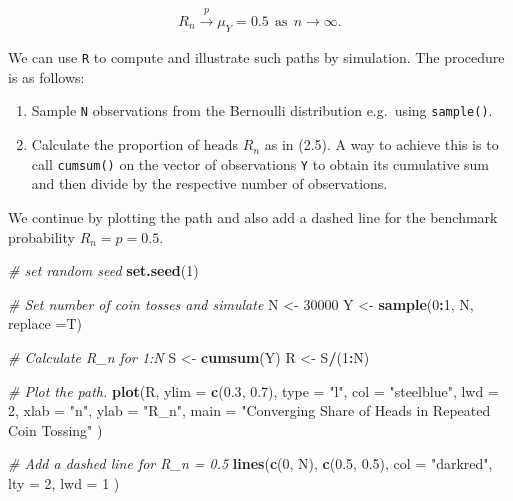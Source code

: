 \documentclass[]{book}
\newenvironment{Shaded}{\begin{snugshade}}{\end{snugshade}}
\newcommand{\KeywordTok}[1]{\textcolor[rgb]{0.13,0.29,0.53}{\textbf{#1}}}
\newcommand{\DataTypeTok}[1]{\textcolor[rgb]{0.13,0.29,0.53}{#1}}
\newcommand{\DecValTok}[1]{\textcolor[rgb]{0.00,0.00,0.81}{#1}}
\newcommand{\FloatTok}[1]{\textcolor[rgb]{0.00,0.00,0.81}{#1}}
\newcommand{\StringTok}[1]{\textcolor[rgb]{0.31,0.60,0.02}{#1}}
\newcommand{\CommentTok}[1]{\textcolor[rgb]{0.56,0.35,0.01}{\textit{#1}}}
\newcommand{\OperatorTok}[1]{\textcolor[rgb]{0.81,0.36,0.00}{\textbf{#1}}}
\newcommand{\NormalTok}[1]{#1}
\providecommand{\tightlist}{%
  \setlength{\itemsep}{0pt}\setlength{\parskip}{0pt}}
\theoremstyle{definition}
\theoremstyle{definition}
\theoremstyle{definition}
\theoremstyle{remark}
\begin{document}
\[ R_n \xrightarrow[]{p} \mu_Y=0.5 \ \ \text{as} \ \ n \rightarrow \infty.  \]

We can use \texttt{R} to compute and illustrate such paths by
simulation. The procedure is as follows:

\begin{enumerate}
\def\labelenumi{\arabic{enumi}.}
\tightlist
\item
  Sample \texttt{N} observations from the Bernoulli distribution
  e.g.~using \texttt{sample()}.
\item
  Calculate the proportion of heads \(R_n\) as in (2.5). A way to
  achieve this is to call \texttt{cumsum()} on the vector of
  observations \texttt{Y} to obtain its cumulative sum and then divide
  by the respective number of observations.
\end{enumerate}

We continue by plotting the path and also add a dashed line for the
benchmark probability \(R_n = p = 0.5\).

\begin{Shaded}
\begin{Highlighting}[]
\CommentTok{# set random seed}
\KeywordTok{set.seed}\NormalTok{(}\DecValTok{1}\NormalTok{)}

\CommentTok{# Set number of coin tosses and simulate}
\NormalTok{N <-}\StringTok{ }\DecValTok{30000}
\NormalTok{Y <-}\StringTok{ }\KeywordTok{sample}\NormalTok{(}\DecValTok{0}\OperatorTok{:}\DecValTok{1}\NormalTok{, N, }\DataTypeTok{replace =}\NormalTok{T)}

\CommentTok{# Calculate R_n for 1:N}
\NormalTok{S <-}\StringTok{ }\KeywordTok{cumsum}\NormalTok{(Y)}
\NormalTok{R <-}\StringTok{ }\NormalTok{S}\OperatorTok{/}\NormalTok{(}\DecValTok{1}\OperatorTok{:}\NormalTok{N)}

\CommentTok{# Plot the path.}
\KeywordTok{plot}\NormalTok{(R, }
     \DataTypeTok{ylim =} \KeywordTok{c}\NormalTok{(}\FloatTok{0.3}\NormalTok{, }\FloatTok{0.7}\NormalTok{), }
     \DataTypeTok{type =} \StringTok{"l"}\NormalTok{, }
     \DataTypeTok{col =} \StringTok{"steelblue"}\NormalTok{, }
     \DataTypeTok{lwd =} \DecValTok{2}\NormalTok{, }
     \DataTypeTok{xlab =} \StringTok{"n"}\NormalTok{, }
     \DataTypeTok{ylab =} \StringTok{"R_n"}\NormalTok{,}
     \DataTypeTok{main =} \StringTok{"Converging Share of Heads in Repeated Coin Tossing"}
\NormalTok{     )}

\CommentTok{# Add a dashed line for R_n = 0.5}
\KeywordTok{lines}\NormalTok{(}\KeywordTok{c}\NormalTok{(}\DecValTok{0}\NormalTok{, N), }
      \KeywordTok{c}\NormalTok{(}\FloatTok{0.5}\NormalTok{, }\FloatTok{0.5}\NormalTok{), }
      \DataTypeTok{col =} \StringTok{"darkred"}\NormalTok{, }
      \DataTypeTok{lty =} \DecValTok{2}\NormalTok{, }
      \DataTypeTok{lwd =} \DecValTok{1}
\NormalTok{      )}
\end{Highlighting}
\end{Shaded}
\end{document}
